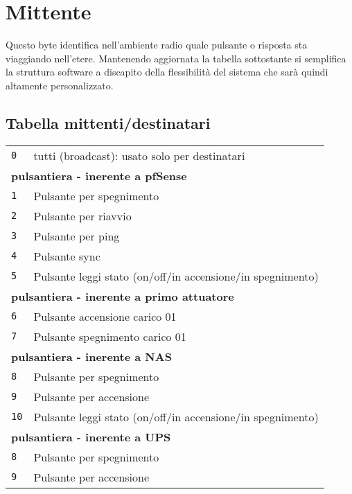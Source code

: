 \documentclass[italian]{article}
\begin{document}
    \section*{Mittente}
    
    Questo byte identifica nell'ambiente radio quale pulsante o risposta sta viaggiando nell'etere. Mantenendo aggiornata la tabella sottostante si semplifica la struttura software a discapito della flessibilità del sistema che sarà quindi altamente personalizzato.
    
    \subsection{Tabella mittenti/destinatari}
    
    

        \begin{tabular}{ll}
            \texttt{0} & tutti (broadcast): usato solo per destinatari\\
            \multicolumn{2}{l}{\textbf{pulsantiera - inerente a pfSense}}\\
            \texttt{1} & Pulsante per spegnimento\\
            \texttt{2} & Pulsante per riavvio\\
            \texttt{3} & Pulsante per ping \\
            \texttt{4} & Pulsante sync \\
            \texttt{5} & Pulsante leggi stato (on/off/in accensione/in spegnimento)\\
            \multicolumn{2}{l}{\textbf{pulsantiera - inerente a primo attuatore}}\\
            \texttt{6} & Pulsante accensione carico 01\\
            \texttt{7} & Pulsante spegnimento carico 01\\
			\multicolumn{2}{l}{\textbf{pulsantiera - inerente a NAS}}\\
			\texttt{8} & Pulsante per spegnimento\\
			\texttt{9} & Pulsante per accensione\\
			\texttt{10} & Pulsante leggi stato (on/off/in accensione/in spegnimento)\\
			\multicolumn{2}{l}{\textbf{pulsantiera - inerente a UPS}}\\
			\texttt{8} & Pulsante per spegnimento\\
			\texttt{9} & Pulsante per accensione\\

\end{tabular}
\end{document}
